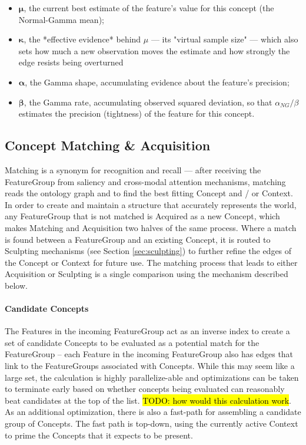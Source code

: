 \documentclass{article}
\begin{document}
\begin{itemize}
    \item $\mathbf{\mu}$, the current best estimate of the feature's value for this concept (the Normal-Gamma mean);
    \item $\mathbf{\kappa}$, the *effective evidence* behind $\mu$ — its "virtual sample size" — which also sets how much a new observation moves the estimate and how strongly the edge resists being overturned
    \item $\mathbf{\alpha}$, the Gamma shape, accumulating evidence about the feature's precision;
    \item $\mathbf{\beta}$, the Gamma rate, accumulating observed squared deviation, so that $\alpha_{NG}/\beta$ estimates the precision (tightness) of the feature for this concept.
\end{itemize}

\subsection{Concept Matching \& Acquisition}\label{sec:matching}
Matching is a synonym for recognition and recall --- after receiving the FeatureGroup from saliency and cross-modal attention mechanisms, matching reads the ontology graph and to find the best fitting Concept and / or Context. In order to create and maintain a structure that accurately represents the world, any FeatureGroup that is not matched is Acquired as a new Concept, which makes Matching and Acquisition two halves of the same process. Where a match is found between a FeatureGroup and an existing Concept, it is routed to Sculpting mechanisms (see Section \ref{sec:sculpting}) to further refine the edges of the Concept or Context for future use. The matching process that leads to either Acquisition or Sculpting is a single comparison using the mechanism described below.

\paragraph{Candidate Concepts}
The Features in the incoming FeatureGroup act as an inverse index to create a set of candidate Concepts to be evaluated as a potential match for the FeatureGroup -- each Feature in the incoming FeatureGroup also has edges that link to the FeatureGroups associated with Concepts. While this may seem like a large set, the calculation is highly parallelize-able and optimizations can be taken to terminate early based on whether concepts being evaluated can reasonably beat candidates at the top of the list. \hl{TODO: how would this calculation work}. As an additional optimization, there is also a fast-path for assembling a candidate group of Concepts. The fast path is top-down, using the currently active Context to prime the Concepts that it expects to be present.
\end{document}
